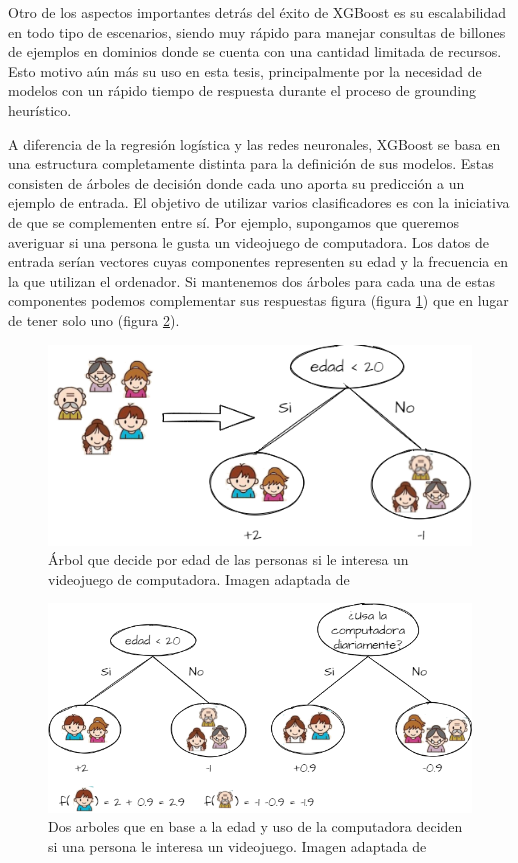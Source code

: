 Otro de los aspectos importantes detrás del éxito de XGBoost es su escalabilidad
en todo tipo de escenarios, siendo muy rápido para manejar consultas de billones
de ejemplos en dominios donde se cuenta con una cantidad limitada de recursos.
Esto motivo aún más su uso en esta tesis, principalmente por la necesidad de
modelos con un rápido tiempo de respuesta durante el proceso de grounding
heurístico.

A diferencia de la regresión logística y las redes neuronales, XGBoost se basa
en una estructura completamente distinta para la definición de sus modelos.
Estas consisten de árboles de decisión donde cada uno aporta su predicción a un
ejemplo de entrada. El objetivo de utilizar varios clasificadores es con la
iniciativa de que se complementen entre sí. Por ejemplo, supongamos que queremos
averiguar si una persona le gusta un videojuego de computadora. Los datos de
entrada serían vectores cuyas componentes representen su edad y la frecuencia en
la que utilizan el ordenador. Si mantenemos dos árboles para cada una de estas
componentes podemos complementar sus respuestas figura (figura \ref{fig:xgboost_tree}) que en lugar de tener solo uno (figura \ref{fig:xgboost_two_tree}).

\begin{figure}
    \centering
    \includegraphics[scale=0.4]{figures/xgboost_tree.png}
    \caption{Árbol que decide por edad de las personas si le interesa un videojuego de computadora. Imagen adaptada de \citep{Tianqi-2016}}
    \label{fig:xgboost_tree}
\end{figure}

\begin{figure}
    \centering
    \includegraphics[scale=0.4]{figures/xgboost_two_tree.png}
    \caption{Dos arboles que en base a la edad y uso de la computadora deciden si una persona le interesa un videojuego. Imagen adaptada de \citep{Tianqi-2016}}
    \label{fig:xgboost_two_tree}
\end{figure}

